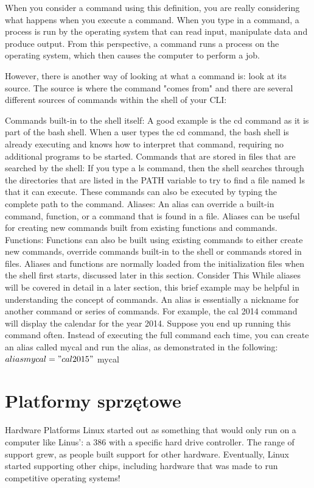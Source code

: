\documentclass[a4paper,titlepage,12pt]{mwart}
\begin{document}
When you consider a command using this definition, you are really considering what happens when you execute a command. When you type in a command, a process is run by the operating system that can read input, manipulate data and produce output. From this perspective, a command runs a process on the operating system, which then causes the computer to perform a job.

However, there is another way of looking at what a command is: look at its source. The source is where the command "comes from" and there are several different sources of commands within the shell of your CLI:

Commands built-in to the shell itself: A good example is the cd command as it is part of the bash shell. When a user types the cd command, the bash shell is already executing and knows how to interpret that command, requiring no additional programs to be started.
Commands that are stored in files that are searched by the shell: If you type a ls command, then the shell searches through the directories that are listed in the PATH variable to try to find a file named ls that it can execute. These commands can also be executed by typing the complete path to the command.
Aliases: An alias can override a built-in command, function, or a command that is found in a file. Aliases can be useful for creating new commands built from existing functions and commands.
Functions: Functions can also be built using existing commands to either create new commands, override commands built-in to the shell or commands stored in files. Aliases and functions are normally loaded from the initialization files when the shell first starts, discussed later in this section.
Consider This
While aliases will be covered in detail in a later section, this brief example may be helpful in understanding the concept of commands.
An alias is essentially a nickname for another command or series of commands. For example, the cal 2014 command will display the calendar for the year 2014. Suppose you end up running this command often. Instead of executing the full command each time, you can create an alias called mycal and run the alias, as demonstrated in the following:
$ alias mycal="cal 2015"
$ mycal
\section{Platformy sprzętowe}
Hardware Platforms
Linux started out as something that would only run on a computer like Linus’: a 386 with a specific hard drive controller. The range of support grew, as people built support for other hardware. Eventually, Linux started supporting other chips, including hardware that was made to run competitive operating systems!
\end{document}

